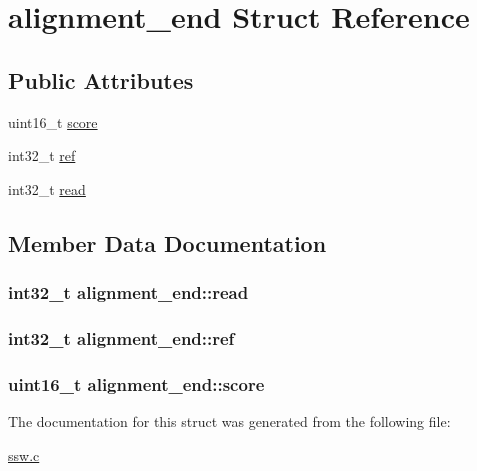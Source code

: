 \hypertarget{structalignment__end}{\section{alignment\-\_\-end Struct Reference}
\label{structalignment__end}
}
\subsection*{Public Attributes}
\begin{DoxyCompactItemize}
\item 
uint16\-\_\-t \hyperlink{structalignment__end_a1de513bdeead6778bf9124d9bc112cfb}{score}
\item 
int32\-\_\-t \hyperlink{structalignment__end_aee73ab28854e114e9976e8518731e9e2}{ref}
\item 
int32\-\_\-t \hyperlink{structalignment__end_a33ff5fb34809e94d0401e4353e3a95e7}{read}
\end{DoxyCompactItemize}


\subsection{Member Data Documentation}
\hypertarget{structalignment__end_a33ff5fb34809e94d0401e4353e3a95e7}{
\subsubsection[{read}]{\setlength{\rightskip}{0pt plus 5cm}int32\-\_\-t alignment\-\_\-end\-::read}}\label{structalignment__end_a33ff5fb34809e94d0401e4353e3a95e7}
\hypertarget{structalignment__end_aee73ab28854e114e9976e8518731e9e2}{
\subsubsection[{ref}]{\setlength{\rightskip}{0pt plus 5cm}int32\-\_\-t alignment\-\_\-end\-::ref}}\label{structalignment__end_aee73ab28854e114e9976e8518731e9e2}
\hypertarget{structalignment__end_a1de513bdeead6778bf9124d9bc112cfb}{
\subsubsection[{score}]{\setlength{\rightskip}{0pt plus 5cm}uint16\-\_\-t alignment\-\_\-end\-::score}}\label{structalignment__end_a1de513bdeead6778bf9124d9bc112cfb}


The documentation for this struct was generated from the following file\-:\begin{DoxyCompactItemize}
\item 
\hyperlink{ssw_8c}{ssw.\-c}\end{DoxyCompactItemize}
